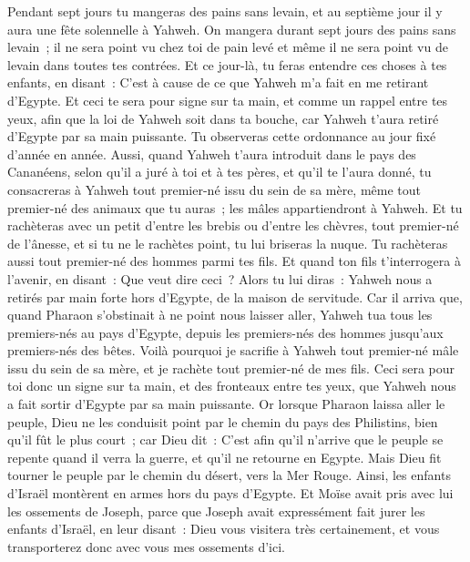 \begin{multicols}{2}
Pendant sept jours tu mangeras des pains sans levain, et au septième jour il y aura une fête solennelle à Yahweh.
On mangera durant sept jours des pains sans levain~; il ne sera point vu chez toi de pain levé et même il ne sera point vu de levain dans toutes tes contrées.
Et ce jour-là, tu feras entendre ces choses à tes enfants, en disant~: C'est à cause de ce que Yahweh m'a fait en me retirant d'Egypte.
Et ceci te sera pour signe sur ta main, et comme un rappel entre tes yeux, afin que la loi de Yahweh soit dans ta bouche, car Yahweh t'aura retiré d'Egypte par sa main puissante.
Tu observeras cette ordonnance au jour fixé d'année en année.
Aussi, quand Yahweh t'aura introduit dans le pays des Cananéens, selon qu'il a juré à toi et à tes pères, et qu'il te l'aura donné,
tu consacreras à Yahweh tout premier-né issu du sein de sa mère, même tout premier-né des animaux que tu auras~; les mâles appartiendront à Yahweh.
Et tu rachèteras avec un petit d'entre les brebis ou d'entre les chèvres, tout premier-né de l'ânesse, et si tu ne le rachètes point, tu lui briseras la nuque. Tu rachèteras aussi tout premier-né des hommes parmi tes fils.
Et quand ton fils t'interrogera à l'avenir, en disant~: Que veut dire ceci~? Alors tu lui diras~: Yahweh nous a retirés par main forte hors d'Egypte, de la maison de servitude.
Car il arriva que, quand Pharaon s'obstinait à ne point nous laisser aller, Yahweh tua tous les premiers-nés au pays d'Egypte, depuis les premiers-nés des hommes jusqu'aux premiers-nés des bêtes. Voilà pourquoi je sacrifie à Yahweh tout premier-né mâle issu du sein de sa mère, et je rachète tout premier-né de mes fils.
Ceci sera pour toi donc un signe sur ta main, et des fronteaux entre tes yeux, que Yahweh nous a fait sortir d'Egypte par sa main puissante.
Or lorsque Pharaon laissa aller le peuple, Dieu ne les conduisit point par le chemin du pays des Philistins, bien qu'il fût le plus court~; car Dieu dit~: C'est afin qu'il n'arrive que le peuple se repente quand il verra la guerre, et qu'il ne retourne en Egypte.
Mais Dieu fit tourner le peuple par le chemin du désert, vers la Mer Rouge. Ainsi, les enfants d'Israël montèrent en armes hors du pays d'Egypte.
Et Moïse avait pris avec lui les ossements de Joseph, parce que Joseph avait expressément fait jurer les enfants d'Israël, en leur disant~: Dieu vous visitera très certainement, et vous transporterez donc avec vous mes ossements d'ici.

\end{multicols}
